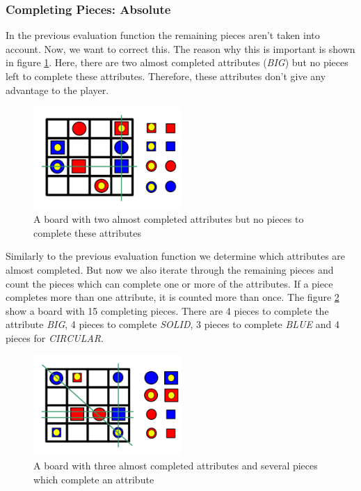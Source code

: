 \subsubsection*{Completing Pieces: Absolute}
In the previous evaluation function the remaining pieces aren't taken into account. Now, we want to correct this. The reason why this is important is shown in figure \ref{fig:completingPiecesAbsoluteB}. Here, there are two almost completed attributes (\emph{BIG}) but no pieces left to complete these attributes. Therefore, these attributes don't give any advantage to the player.
\begin{figure}[h]
  \centering
  \includegraphics[width=0.5\textwidth]{images/completingPiecesAbsoluteB}
  \caption{A board with two almost completed attributes but no pieces to complete these attributes}
  \label{fig:completingPiecesAbsoluteB}
\end{figure}

Similarly to the previous evaluation function we determine which attributes are almost completed. But now we also iterate through the remaining pieces and count the pieces which can complete one or more of the attributes. If a piece completes more than one attribute, it is counted more than once. The figure \ref{fig:completingPiecesAbsoluteA} show a board with 15 completing pieces. There are 4 pieces to complete the attribute \emph{BIG}, 4 pieces to complete \emph{SOLID}, 3 pieces to complete \emph{BLUE} and 4 pieces for \emph{CIRCULAR}.
\begin{figure}[h]
  \centering
  \includegraphics[width=0.5\textwidth]{images/completingPiecesAbsoluteA}
  \caption{A board with three almost completed attributes and several pieces which complete an attribute}
  \label{fig:completingPiecesAbsoluteA}
\end{figure}
